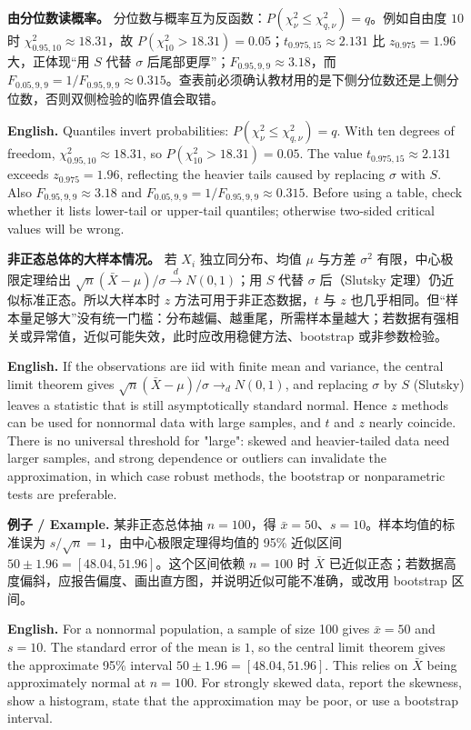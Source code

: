 \documentclass[UTF8,11pt,a4paper]{ctexart}
\newcommand{\EN}[1]{\par\noindent\textbf{English.} #1\par}
\newcommand{\EX}[2]{\par\noindent\textbf{例子 / Example.} #1\par\EN{#2}}
\begin{document}
\noindent\textbf{由分位数读概率。} 分位数与概率互为反函数：$P(\chi^2_\nu\le\chi^2_{q,\nu})=q$。例如自由度 $10$ 时 $\chi^2_{0.95,10}\approx18.31$，故 $P(\chi^2_{10}>18.31)=0.05$；$t_{0.975,15}\approx2.131$ 比 $z_{0.975}=1.96$ 大，正体现“用 $S$ 代替 $\sigma$ 后尾部更厚”；$F_{0.95,9,9}\approx3.18$，而 $F_{0.05,9,9}=1/F_{0.95,9,9}\approx0.315$。查表前必须确认教材用的是下侧分位数还是上侧分位数，否则双侧检验的临界值会取错。
\EN{Quantiles invert probabilities: $P(\chi^2_\nu\le\chi^2_{q,\nu})=q$. With ten degrees of freedom, $\chi^2_{0.95,10}\approx18.31$, so $P(\chi^2_{10}>18.31)=0.05$. The value $t_{0.975,15}\approx2.131$ exceeds $z_{0.975}=1.96$, reflecting the heavier tails caused by replacing $\sigma$ with $S$. Also $F_{0.95,9,9}\approx3.18$ and $F_{0.05,9,9}=1/F_{0.95,9,9}\approx0.315$. Before using a table, check whether it lists lower-tail or upper-tail quantiles; otherwise two-sided critical values will be wrong.}

\noindent\textbf{非正态总体的大样本情况。} 若 $X_i$ 独立同分布、均值 $\mu$ 与方差 $\sigma^2$ 有限，中心极限定理给出 $\sqrt n(\bar X-\mu)/\sigma\xrightarrow{\ d\ }N(0,1)$；用 $S$ 代替 $\sigma$ 后（Slutsky 定理）仍近似标准正态。所以大样本时 $z$ 方法可用于非正态数据，$t$ 与 $z$ 也几乎相同。但“样本量足够大”没有统一门槛：分布越偏、越重尾，所需样本量越大；若数据有强相关或异常值，近似可能失效，此时应改用稳健方法、bootstrap 或非参数检验。
\EN{If the observations are iid with finite mean and variance, the central limit theorem gives $\sqrt n(\bar X-\mu)/\sigma\to_d N(0,1)$, and replacing $\sigma$ by $S$ (Slutsky) leaves a statistic that is still asymptotically standard normal. Hence $z$ methods can be used for nonnormal data with large samples, and $t$ and $z$ nearly coincide. There is no universal threshold for "large": skewed and heavier-tailed data need larger samples, and strong dependence or outliers can invalidate the approximation, in which case robust methods, the bootstrap or nonparametric tests are preferable.}

\EX{某非正态总体抽 $n=100$，得 $\bar x=50$、$s=10$。样本均值的标准误为 $s/\sqrt n=1$，由中心极限定理得均值的 95\% 近似区间 $50\pm1.96=[48.04,51.96]$。这个区间依赖 $n=100$ 时 $\bar X$ 已近似正态；若数据高度偏斜，应报告偏度、画出直方图，并说明近似可能不准确，或改用 bootstrap 区间。}{For a nonnormal population, a sample of size 100 gives $\bar x=50$ and $s=10$. The standard error of the mean is $1$, so the central limit theorem gives the approximate 95\% interval $50\pm1.96=[48.04,51.96]$. This relies on $\bar X$ being approximately normal at $n=100$. For strongly skewed data, report the skewness, show a histogram, state that the approximation may be poor, or use a bootstrap interval.}
\end{document}
